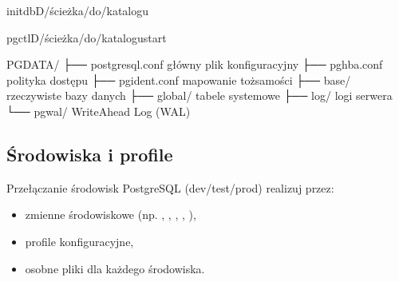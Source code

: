 \documentclass[a4paper,11pt,english,openany,oneside]{sphinxmanual}
\begin{document}
\sphinxAtStartPar
{}

\begin{sphinxVerbatim}[commandchars=\\\{\}]
initdb\PYGZhy{}D/ścieżka/do/katalogu

pg\PYGZus{}ctl\PYGZhy{}D/ścieżka/do/katalogustart
\end{sphinxVerbatim}

\sphinxAtStartPar
{}

\begin{sphinxVerbatim}[commandchars=\\\{\}]
\PYGZdl{}PGDATA/
├── postgresql.conf   \PYGZsh{} główny plik konfiguracyjny
├── pg\PYGZus{}hba.conf       \PYGZsh{} polityka dostępu
├── pg\PYGZus{}ident.conf     \PYGZsh{} mapowanie tożsamości
├── base/             \PYGZsh{} rzeczywiste bazy danych
├── global/           \PYGZsh{} tabele systemowe
├── log/              \PYGZsh{} logi serwera
└── pg\PYGZus{}wal/           \PYGZsh{} Write\PYGZhy{}Ahead Log (WAL)
\end{sphinxVerbatim}

\sphinxAtStartPar
{}

\begin{sphinxVerbatim}[commandchars=\\\{\}]
\end{sphinxVerbatim}


\subsection{Środowiska i profile}
\label{\detokenize{rozdzial_2/rozdzial_22/index:srodowiska-i-profile}}
\sphinxAtStartPar
Przełączanie środowisk PostgreSQL (dev/test/prod) realizuj przez:
\begin{itemize}
\item {} 
\sphinxAtStartPar
zmienne środowiskowe (np. , , , , ),

\item {} 
\sphinxAtStartPar
profile konfiguracyjne,

\item {} 
\sphinxAtStartPar
osobne pliki  dla każdego środowiska.

\end{itemize}
\end{document}
